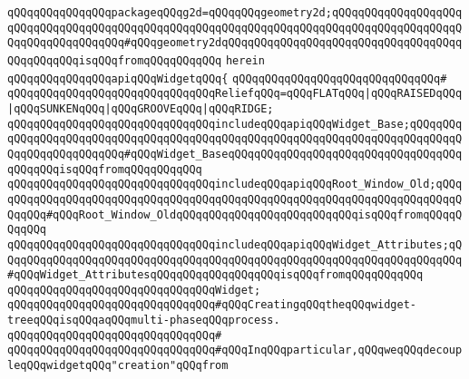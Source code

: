 \verb|qQQqqQQqqQQqqQQqpackageqQQqg2d=qQQqqQQqgeometry2d;qQQqqQQqqQQqqQQqqQQqqQQqqQQqqQQqqQQqqQQqqQQqqQQqqQQqqQQqqQQqqQQqqQQqqQQqqQQqqQQqqQQqqQQqqQQqqQQqqQQqqQQqqQQq#qQQqgeometry2dqQQqqQQqqQQqqQQqqQQqqQQqqQQqqQQqqQQqqQQqqQQqqQQqisqQQqfromqQQqqQQqqQQq|\newline
\verb|herein|\newline
\newline
\verb|qQQqqQQqqQQqqQQqapiqQQqWidgetqQQq{|\newline
\verb|qQQqqQQqqQQqqQQqqQQqqQQqqQQqqQQq#|\newline
\verb|qQQqqQQqqQQqqQQqqQQqqQQqqQQqqQQqReliefqQQq=qQQqFLATqQQq|\verb#|qQQqRAISEDqQQq|qQQqSUNKENqQQq|qQQqGROOVEqQQq|qQQqRIDGE;#\newline
\newline
\verb|qQQqqQQqqQQqqQQqqQQqqQQqqQQqqQQqincludeqQQqapiqQQqWidget_Base;qQQqqQQqqQQqqQQqqQQqqQQqqQQqqQQqqQQqqQQqqQQqqQQqqQQqqQQqqQQqqQQqqQQqqQQqqQQqqQQqqQQqqQQqqQQqqQQq#qQQqWidget_BaseqQQqqQQqqQQqqQQqqQQqqQQqqQQqqQQqqQQqqQQqqQQqisqQQqfromqQQqqQQqqQQq|\newline
\verb|qQQqqQQqqQQqqQQqqQQqqQQqqQQqqQQqincludeqQQqapiqQQqRoot_Window_Old;qQQqqQQqqQQqqQQqqQQqqQQqqQQqqQQqqQQqqQQqqQQqqQQqqQQqqQQqqQQqqQQqqQQqqQQqqQQqqQQq#qQQqRoot_Window_OldqQQqqQQqqQQqqQQqqQQqqQQqqQQqisqQQqfromqQQqqQQqqQQq|\newline
\verb|qQQqqQQqqQQqqQQqqQQqqQQqqQQqqQQqincludeqQQqapiqQQqWidget_Attributes;qQQqqQQqqQQqqQQqqQQqqQQqqQQqqQQqqQQqqQQqqQQqqQQqqQQqqQQqqQQqqQQqqQQqqQQq#qQQqWidget_AttributesqQQqqQQqqQQqqQQqqQQqisqQQqfromqQQqqQQqqQQq|\newline
\newline
\verb|qQQqqQQqqQQqqQQqqQQqqQQqqQQqqQQqWidget;|\newline
\newline
\newline
\verb|qQQqqQQqqQQqqQQqqQQqqQQqqQQqqQQq#qQQqCreatingqQQqtheqQQqwidget-treeqQQqisqQQqaqQQqmulti-phaseqQQqprocess.|\newline
\verb|qQQqqQQqqQQqqQQqqQQqqQQqqQQqqQQq#|\newline
\verb|qQQqqQQqqQQqqQQqqQQqqQQqqQQqqQQq#qQQqInqQQqparticular,qQQqweqQQqdecoupleqQQqwidgetqQQq"creation"qQQqfrom|\newline
